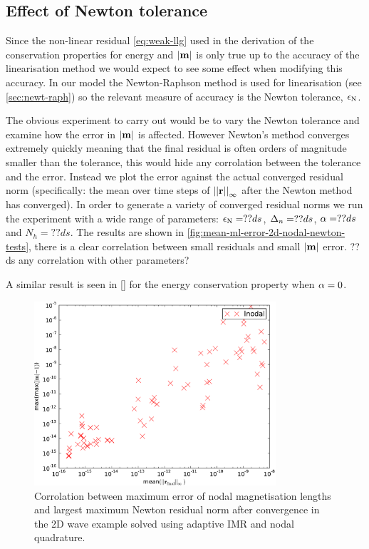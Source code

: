\subsection{Effect of Newton tolerance}
\label{sec:effect-newt-toler-m-conservation}

Since the non-linear residual \cref{eq:weak-llg} used in the derivation of the conservation properties for energy and $\left|{\boldsymbol{\mathrm{m}}} \right|$ is only true up to the accuracy of the linearisation method we would expect to see some effect when modifying this accuracy.
In our model the Newton-Raphson method is used for linearisation (see \cref{sec:newt-raph}) so the relevant measure of accuracy is the Newton tolerance, $\epsilon_{\mathrm{N}}$.

The obvious experiment to carry out would be to vary the Newton tolerance and examine how the error in $\left|{\boldsymbol{\mathrm{m}}} \right|$ is affected.
However Newton's method converges extremely quickly meaning that the final residual is often orders of magnitude smaller than the tolerance, this would hide any corrolation between the tolerance and the error.
Instead we plot the error against the actual converged residual norm (specifically: the mean over time steps of $\left| \left| \boldsymbol{\mathrm{r}} \right| \right|_\infty$ after the Newton method has converged).
In order to generate a variety of converged residual norms we run the experiment with a wide range of parameters: $\epsilon_{\mathrm{N}} = ??ds$, $\Delta_{n} = ??ds$, $\alpha = ??ds$ and $N_h = ??ds$.
The results are shown in \cref{fig:mean-ml-error-2d-nodal-newton-tests}, there is a clear correlation between small residuals and small $\left|{\boldsymbol{\mathrm{m}}} \right|$ error.
??ds any correlation with other parameters?

A similar result is seen in \cref{} for the energy conservation property when $\alpha = 0$.

\begin{figure}
  \centering
  \includegraphics[width=0.8\textwidth]
  {plots/2d_wave_solution_m_length_newton_res/-maxmaxmathbfm-1vsmeanmathbfr_mathrmfinal_infty.pdf}
  \caption{Corrolation between maximum error of nodal magnetisation lengths and largest maximum Newton residual norm after convergence in the 2D wave example solved using adaptive IMR and nodal quadrature.}
  \label{fig:ml-error-2d-nodal-newton-tests}
\end{figure}


